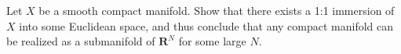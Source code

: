 Let $X$ be a smooth compact manifold. Show that there exists a 1:1 immersion of $X$ into some Euclidean space, and thus conclude that any compact manifold can be realized as a submanifold of $\mathbf{R}^N$ for some large $N$.
